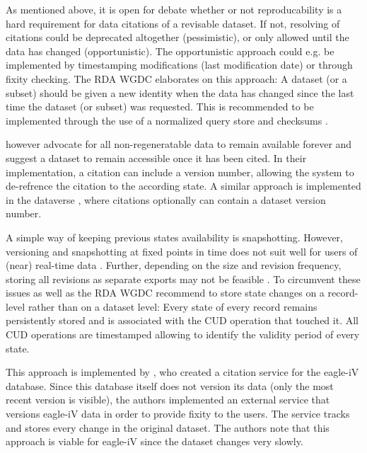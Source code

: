 \documentclass[a4paper,10pt]{article}
\begin{document}
As mentioned above, it is open for debate whether or not reproducability is a hard requirement for data citations of a revisable dataset. If not, resolving of citations could be deprecated altogether (pessimistic), or only allowed until the data has changed (opportunistic). The opportunistic approach could e.g. be implemented by timestamping modifications (last modification date) or through fixity checking. The \gls{RDA} \gls{WGDC} \citep{Rauber2015} elaborates on this approach: A dataset (or a subset) should be given a new identity when the data has changed since the last time the dataset (or subset) was requested. This is recommended to be implemented through the use of a normalized query store and checksums \citep{Ball2015}.

\cite{Gray2002} however advocate for all non-regeneratable data to remain available forever and  \cite{Buneman2010} suggest a dataset to remain accessible once it has been cited. In their implementation, a citation can include a version number, allowing the system to de-refrence the citation to the according state. A similar approach is implemented in the dataverse \citep{Crosas2011}, where citations optionally can contain a dataset version number. 

A simple way of keeping previous states availability is snapshotting. However, versioning and snapshotting at fixed points in time does not suit well for users of (near) real-time data  \citep{Huber2015}. Further, depending on the size and revision frequency, storing all revisions as separate exports may not be feasible \citep{Rauber2015}. To circumvent these issues \cite{AltKin07} as well as the \gls{RDA} \gls{WGDC} \citep{Rauber2015a, Rauber2015, Proll2013} recommend to store state changes on a record-level rather than on a dataset level: Every state of every record remains persistently stored and is associated with the \gls{CUD} operation that touched it. All \gls{CUD} operations are timestamped allowing to identify the validity period of every state.

This approach is implemented by \cite{Alawini2017}, who created a citation service for the eagle-iV database. Since this database itself does not version its data (only the most recent version is visible), the authors implemented an external service that versions eagle-iV data in order to provide fixity to the users. The service tracks and stores every change in the original dataset.  The authors note that this approach is viable for eagle-iV since the dataset changes very slowly.
\end{document}
